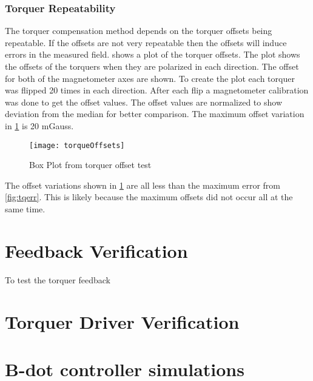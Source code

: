 \clearpage
\subsubsection{Torquer Repeatability}

The torquer compensation method depends on the torquer offsets being repeatable. If the offsets are not very repeatable then the offsets will induce errors in the measured field.  shows a plot of the torquer offsets. The plot shows the offsets of the torquers when they are polarized in each direction. The offset for both of the magnetometer axes are shown. To create the plot each torquer was flipped 20 times in each direction. After each flip a magnetometer calibration was done to get the offset values. The offset values are normalized to show deviation from the median for better comparison. The maximum offset variation in \cref{fig:tqoff} is 20 mGauss.

\begin{figure}[!ht]
    \centering
    \texttt{[image: torqueOffsets]}
    \caption{Box Plot from torquer offset test}
    \label{fig:tqoff}
\end{figure}

The offset variations shown in \cref{fig:tqoff} are all less than the maximum error from \cref{fig:tqerr}. This is likely because the maximum offsets did not occur all at the same time.

\section{Feedback Verification}

To test the torquer feedback 


\section{Torquer Driver Verification}


\section{B-dot controller simulations}

